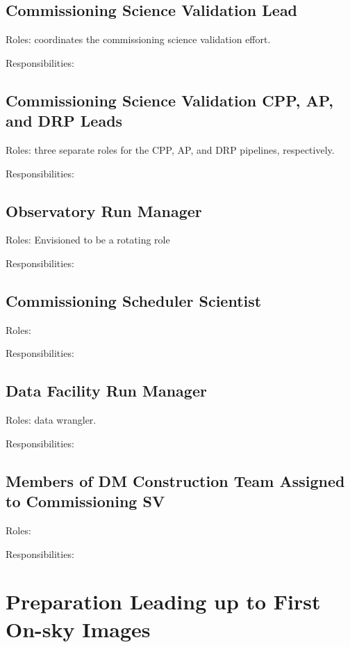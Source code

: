 \documentclass[DM,lsstdraft,toc]{lsstdoc}
\begin{document}
\subsection{Commissioning Science Validation Lead}

Roles: coordinates the commissioning science validation effort.

Responsibilities:

\subsection{Commissioning Science Validation CPP, AP, and DRP Leads}

Roles: three separate roles for the CPP, AP, and DRP pipelines, respectively.

Responsibilities:

\subsection{Observatory Run Manager}

Roles: Envisioned to be a rotating role 

Responsibilities:

\subsection{Commissioning Scheduler Scientist}

Roles:

Responsibilities: 

\subsection{Data Facility Run Manager}

Roles: data wrangler.

Responsibilities:

\subsection{Members of DM Construction Team Assigned to Commissioning SV}

Roles:

Responsibilities:

\section{Preparation Leading up to First On-sky Images}
\end{document}
